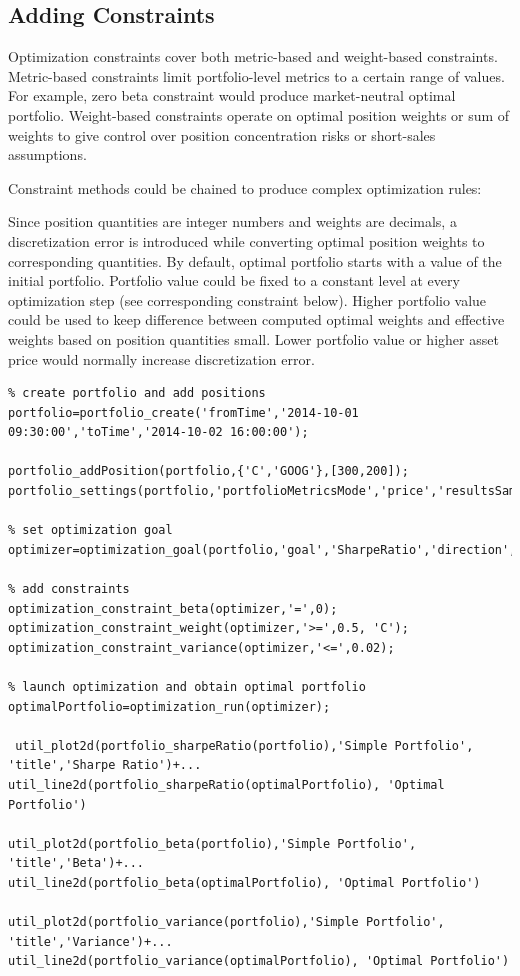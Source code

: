 \documentclass[letterpaper]{report}
\begin{document}
\subsection{Adding Constraints}
Optimization constraints cover both metric-based and weight-based
constraints. Metric-based constraints limit portfolio-level metrics to a certain
range of values. For example, zero beta constraint would produce market-neutral optimal portfolio.
Weight-based constraints operate on optimal position weights or sum of weights to 
give control over position concentration risks or short-sales assumptions.
\par
Constraint methods could be chained to produce complex optimization rules:
\par
Since position quantities are integer numbers and weights are decimals, a discretization error is introduced while converting optimal position weights to corresponding quantities. 
By default, optimal portfolio starts with a value of the initial portfolio. 
Portfolio value could be fixed to a constant level at every optimization step
(see corresponding constraint below).
Higher portfolio value could be used to keep difference between computed optimal weights and effective weights based on position quantities small.
Lower portfolio value or higher asset price would normally increase discretization error.

\begin{lstlisting}
% create portfolio and add positions
portfolio=portfolio_create('fromTime','2014-10-01 09:30:00','toTime','2014-10-02 16:00:00');

portfolio_addPosition(portfolio,{'C','GOOG'},[300,200]);
portfolio_settings(portfolio,'portfolioMetricsMode','price','resultsSamplingInterval','30m');

% set optimization goal
optimizer=optimization_goal(portfolio,'goal','SharpeRatio','direction','maximize');

% add constraints
optimization_constraint_beta(optimizer,'=',0);
optimization_constraint_weight(optimizer,'>=',0.5, 'C');
optimization_constraint_variance(optimizer,'<=',0.02);
 
% launch optimization and obtain optimal portfolio
optimalPortfolio=optimization_run(optimizer);

 util_plot2d(portfolio_sharpeRatio(portfolio),'Simple Portfolio', 'title','Sharpe Ratio')+...
util_line2d(portfolio_sharpeRatio(optimalPortfolio), 'Optimal Portfolio')

util_plot2d(portfolio_beta(portfolio),'Simple Portfolio', 'title','Beta')+...
util_line2d(portfolio_beta(optimalPortfolio), 'Optimal Portfolio')

util_plot2d(portfolio_variance(portfolio),'Simple Portfolio', 'title','Variance')+...
util_line2d(portfolio_variance(optimalPortfolio), 'Optimal Portfolio')
\end{lstlisting}
\end{document}
